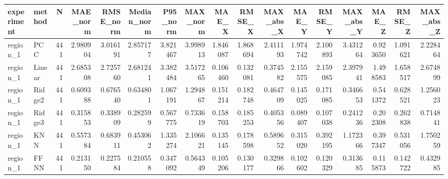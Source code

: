 \begin{tabular}{llrrrrrrrrrrrrrrr}
\toprule
experiment & method & N & MAE_norm & RMSE_norm & Median_norm & P95_norm & MAX_norm & MAE_X & RMSE_X & MAX_abs_X & MAE_Y & RMSE_Y & MAX_abs_Y & MAE_Z & RMSE_Z & MAX_abs_Z \\
\midrule
region_1 & PCC & 441 & 2.980904 & 3.016191 & 2.857177 & 3.821467 & 3.998913 & 1.846087 & 1.868694 & 2.411193 & 1.974742 & 2.100893 & 3.431264 & 0.923650 & 1.091621 & 2.228464 \\
region_1 & Linear & 441 & 2.685308 & 2.725760 & 2.681241 & 3.382484 & 3.517265 & 0.106460 & 0.132081 & 0.374582 & 2.155575 & 2.159085 & 2.397941 & 1.498583 & 1.658517 & 2.674899 \\
region_1 & Ridge2 & 441 & 0.609388 & 0.676540 & 0.634801 & 1.067191 & 1.294867 & 0.151214 & 0.182748 & 0.464709 & 0.145025 & 0.171085 & 0.346653 & 0.541372 & 0.628521 & 1.256023 \\
region_1 & Ridge3 & 441 & 0.315853 & 0.338909 & 0.282599 & 0.567775 & 0.733619 & 0.158703 & 0.185253 & 0.405356 & 0.089407 & 0.107038 & 0.241236 & 0.202308 & 0.262838 & 0.714841 \\
region_1 & KNN & 441 & 0.557384 & 0.683911 & 0.453062 & 1.335274 & 2.106621 & 0.135145 & 0.178598 & 0.589652 & 0.315020 & 0.392195 & 1.172366 & 0.397347 & 0.531056 & 1.750259 \\
region_1 & FFNN & 441 & 0.213150 & 0.227584 & 0.210558 & 0.347092 & 0.564349 & 0.105206 & 0.130177 & 0.329866 & 0.102602 & 0.120329 & 0.313685 & 0.115873 & 0.142722 & 0.432985 \\
\bottomrule
\end{tabular}
